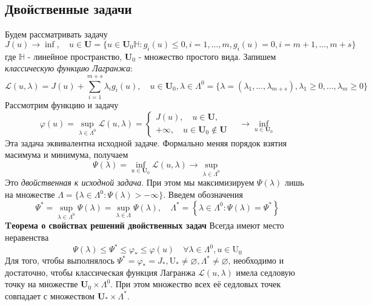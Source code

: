 \documentclass[A4]{article}
\begin{document}
\subsection{Двойственные задачи}
Будем рассматривать задачу
\begin{equation*}
J(u)\rightarrow\inf,\quad u\in\mathbf{U}=\{u\in\mathbf{U}_0\mathbb{H}:g_i(u)\leqslant 0,i=1,\ldots,m,g_i(u)=0,i=m+1,\ldots,m+s \}
\end{equation*}
где $\mathbb{H}$ - линейное пространство, $\mathbf{U}_0$ - множество простого вида. Запишем \emph{классическую функцию Лагранжа}:
\begin{equation*}
\mathcal{L}(u,\lambda)=J(u)+\sum_{i=1}^{m+s}\lambda_ig_i(u),\quad u\in\mathbf{U}_0,\lambda\in\Lambda^0=\{\lambda=(\lambda_1,\ldots,\lambda_{m+s}),\lambda_1\geqslant 0,\ldots,\lambda_m\geqslant 0 \}
\end{equation*}
Рассмотрим функцию и задачу
\begin{equation*}
\varphi(u)=\sup_{\lambda\in\Lambda^0}\mathcal{L}(u,\lambda)= \left\{\begin{array}{l}
J(u),\quad u\in \mathbf{U},\\
+\infty,\quad u\in\mathbf{U}_0\notin \mathbf{U}
\end{array}\right.\quad\rightarrow\inf_{u\in\mathbf{U}_0}
\end{equation*}
Эта задача эквивалентна исходной задаче. Формально меняя порядок взятия масимума и минимума, получаем
\begin{equation*}
\Psi(\lambda)=\inf_{u\in\mathbf{U}_0}\mathcal{L}(u,\lambda)\rightarrow\sup_{\lambda\in\Lambda^0}
\end{equation*}
Это \emph{двойственная к исходной задача}. При этом мы максимизируем $\Psi(\lambda)$ лишь на множестве $\Lambda=\{\lambda\in\Lambda^0:\Psi(\lambda)>-\infty \}$. Введем обозначения
\begin{equation*}
\Psi^{*}=\sup _{\lambda \in \Lambda^{0}} \Psi(\lambda)=\sup _{\lambda \in \Lambda} \Psi(\lambda), \quad \Lambda^{*}=\left\{\lambda \in \Lambda^{0}: \Psi(\lambda)=\Psi^{*}\right\}
\end{equation*}
\textbf{Tеорема о свойствах решений двойственных задач} Всегда имеют место неравенства
\begin{equation*}
\Psi(\lambda) \leqslant \Psi^{*} \leqslant \varphi_{*} \leqslant \varphi(u) \quad \forall \lambda \in \Lambda^{0}, u \in \mathrm{U}_{0}
\end{equation*}
Для того, чтобы выполнялось $ \Psi^{*}=\varphi_{*}=J_{*}, \mathrm{U}_{*} \neq \varnothing, \Lambda^{*} \neq \varnothing$, необходимо и достаточно, чтобы классическая функция Лагранжа $ \mathcal{L}(u, \lambda) $ имела седловую точку на множестве $ \mathbf{U}_{0} \times \Lambda^{0} $.  При этом множество всех её седловых точек совпадает с множеством $ \mathbf{U}_{*} \times \Lambda^{*} $.\\
\end{document}
